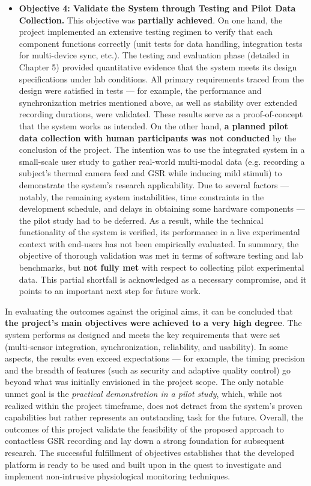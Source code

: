 \documentclass[11pt,a4paper]{report}
\begin{document}
\begin{itemize}
\item \textbf{Objective 4: Validate the System through Testing and Pilot Data
  Collection.} This objective was \textbf{partially achieved}. On one hand,
  the project implemented an extensive testing regimen to verify that
  each component functions correctly (unit tests for data handling,
  integration tests for multi-device sync, etc.). The testing and
  evaluation phase (detailed in Chapter 5) provided quantitative
  evidence that the system meets its design specifications under lab
  conditions. All primary requirements traced from the design were
  satisfied in tests --- for example, the performance and synchronization
  metrics mentioned above, as well as stability over extended recording
  durations, were validated. These results serve as a proof-of-concept
  that the system works as intended. On the other hand, \textbf{a planned
  pilot data collection with human participants was not conducted} by
  the conclusion of the project. The intention was to use the integrated
  system in a small-scale user study to gather real-world multi-modal
  data (e.g. recording a subject's thermal camera feed and GSR while
  inducing mild stimuli) to demonstrate the system's research
  applicability. Due to several factors --- notably, the remaining system
  instabilities, time constraints in the development schedule, and
  delays in obtaining some hardware components --- the pilot study had to
  be deferred. As a result, while the technical functionality of the
  system is verified, its performance in a live experimental context
  with end-users has not been empirically evaluated. In summary, the
  objective of thorough validation was met in terms of software testing
  and lab benchmarks, but \textbf{not fully met} with respect to collecting
  pilot experimental data. This partial shortfall is acknowledged as a
  necessary compromise, and it points to an important next step for
  future work.

\end{itemize}
In evaluating the outcomes against the original aims, it can be
concluded that \textbf{the project's main objectives were achieved to a very
high degree}. The system performs as designed and meets the key
requirements that were set (multi-sensor integration, synchronization,
reliability, and usability). In some aspects, the results even exceed
expectations --- for example, the timing precision and the breadth of
features (such as security and adaptive quality control) go beyond what
was initially envisioned in the project scope. The only notable unmet
goal is the \textit{practical demonstration in a pilot study}, which, while not
realized within the project timeframe, does not detract from the
system's proven capabilities but rather represents an outstanding task
for the future. Overall, the outcomes of this project validate the
feasibility of the proposed approach to contactless GSR recording and
lay down a strong foundation for subsequent research. The successful
fulfillment of objectives establishes that the developed platform is
ready to be used and built upon in the quest to investigate and
implement non-intrusive physiological monitoring techniques.
\end{document}
